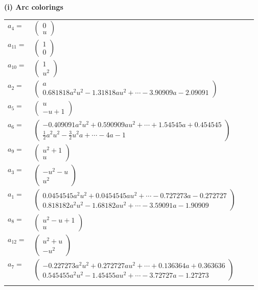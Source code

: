 \documentclass[1p]{elsarticle_modified}
\theoremstyle{definition}
\begin{document}
\flushleft \textbf{(i) Arc colorings}\\
\begin{tabular}{m{7pt} m{180pt} m{7pt} m{180pt} }
\flushright $a_{4}=$&$\begin{pmatrix}0\\u\end{pmatrix}$ \\
\flushright $a_{11}=$&$\begin{pmatrix}1\\0\end{pmatrix}$ \\
\flushright $a_{10}=$&$\begin{pmatrix}1\\u^2\end{pmatrix}$ \\
\flushright $a_{2}=$&$\begin{pmatrix}a\\0.681818 a^{2} u^{2}-1.31818 a u^{2}+\cdots-3.90909 a-2.09091\end{pmatrix}$ \\
\flushright $a_{5}=$&$\begin{pmatrix}u\\- u+1\end{pmatrix}$ \\
\flushright $a_{6}=$&$\begin{pmatrix}-0.409091 a^{2} u^{2}+0.590909 a u^{2}+\cdots+1.54545 a+0.454545\\\frac{1}{2} a^2 u^2-\frac{3}{2} u^2 a+\cdots-4 a-1\end{pmatrix}$ \\
\flushright $a_{9}=$&$\begin{pmatrix}u^2+1\\u\end{pmatrix}$ \\
\flushright $a_{3}=$&$\begin{pmatrix}- u^2- u\\u^2\end{pmatrix}$ \\
\flushright $a_{1}=$&$\begin{pmatrix}0.0454545 a^{2} u^{2}+0.0454545 a u^{2}+\cdots-0.727273 a-0.272727\\0.818182 a^{2} u^{2}-1.68182 a u^{2}+\cdots-3.59091 a-1.90909\end{pmatrix}$ \\
\flushright $a_{8}=$&$\begin{pmatrix}u^2- u+1\\u\end{pmatrix}$ \\
\flushright $a_{12}=$&$\begin{pmatrix}u^2+u\\- u^2\end{pmatrix}$ \\
\flushright $a_{7}=$&$\begin{pmatrix}-0.227273 a^{2} u^{2}+0.272727 a u^{2}+\cdots+0.136364 a+0.363636\\0.545455 a^{2} u^{2}-1.45455 a u^{2}+\cdots-3.72727 a-1.27273\end{pmatrix}$\\&\end{tabular}
\end{document}
